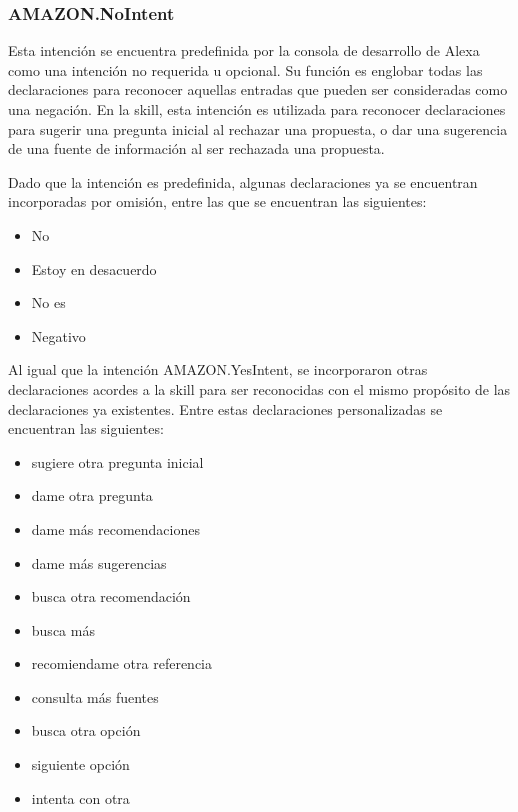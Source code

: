 
\subsubsection{AMAZON.NoIntent}
\label{NoIntentcapIV}

Esta intención se encuentra predefinida por la consola de desarrollo de Alexa como una intención no requerida u opcional. Su función es englobar todas las declaraciones para reconocer aquellas entradas que pueden ser consideradas como una negación. En la skill, esta intención es utilizada para reconocer declaraciones para sugerir una pregunta inicial al rechazar una propuesta, o dar una sugerencia de una fuente de información al ser rechazada una propuesta.

Dado que la intención es predefinida, algunas declaraciones ya se encuentran incorporadas por omisión, entre las que se encuentran las siguientes:

\begin{itemize}
  \item No
  \item Estoy en desacuerdo
  \item No es
  \item Negativo
\end{itemize}

Al igual que la intención AMAZON.YesIntent, se incorporaron otras declaraciones acordes a la skill para ser reconocidas con el mismo propósito de las declaraciones ya existentes. Entre estas declaraciones personalizadas se encuentran las siguientes:

\begin{itemize}
  \item sugiere otra pregunta inicial
  \item dame otra pregunta
  \item dame más recomendaciones
  \item dame más sugerencias
  \item busca otra recomendación
  \item busca más
  \item recomiendame otra referencia
  \item consulta más fuentes
  \item busca otra opción
  \item siguiente opción
  \item intenta con otra
\end{itemize}

